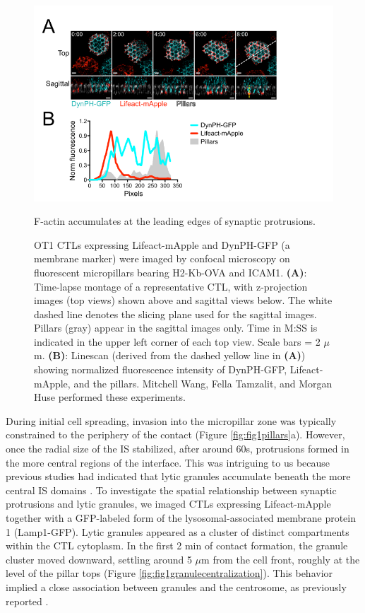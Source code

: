 \begin{figure}[htbp]
	\centering
	\includegraphics[width=\textwidth]{../figures/chapter2/fig1actinleadingedge.png}
	\caption{F-actin accumulates at the leading edges of synaptic protrusions.}
	\caption*{OT1 CTLs expressing Lifeact-mApple and DynPH-GFP (a membrane marker) were imaged by confocal microscopy on fluorescent micropillars bearing H2-Kb-OVA and ICAM1. \textbf{(A)}: Time-lapse montage of a representative CTL, with z-projection images (top views) shown above and sagittal views below. The white dashed line denotes the slicing plane used for the sagittal images. Pillars (gray) appear in the sagittal images only. Time in M:SS is indicated in the upper left corner of each top view. Scale bars = 2 $\mu$m. \textbf{(B)}: Linescan (derived from the dashed yellow line in \textbf{(A)}) showing normalized fluorescence intensity of DynPH-GFP, Lifeact-mApple, and the pillars. Mitchell Wang, Fella Tamzalit, and Morgan Huse performed these experiments.}
	\label{fig:fig1actinleadingedge}
\end{figure}

During initial cell spreading, invasion into the micropillar zone was typically constrained to the periphery of the contact (Figure \ref{fig:fig1pillars}a). However, once the radial size of the IS stabilized, after around 60s, protrusions formed in the more central regions of the interface. This was intriguing to us because previous studies had indicated that lytic granules accumulate beneath the more central IS domains \cite{Stinchcombe2007, Stinchcombe2006, Beal2009, Stinchcombe2001}. To investigate the spatial relationship between synaptic protrusions and lytic granules, we imaged CTLs expressing Lifeact-mApple together with a GFP-labeled form of the lysosomal-associated membrane protein 1 (Lamp1-GFP). Lytic granules appeared as a cluster of distinct compartments within the CTL cytoplasm. In the first 2 min of contact formation, the granule cluster moved downward, settling around 5 $\mu$m from the cell front, roughly at the level of the pillar tops (Figure \ref{fig:fig1granulecentralization}). This behavior implied a close association between granules and the centrosome, as previously reported \cite{Stinchcombe2006, Kupfer1984, Stinchcombe2001}.

